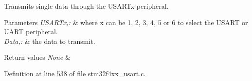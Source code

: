 Transmits single data through the U\-S\-A\-R\-Tx peripheral. 


\begin{DoxyParams}{Parameters}
{\em U\-S\-A\-R\-Tx,\-:} & where x can be 1, 2, 3, 4, 5 or 6 to select the U\-S\-A\-R\-T or U\-A\-R\-T peripheral. \\
\hline
{\em Data,\-:} & the data to transmit. \\
\hline
\end{DoxyParams}

\begin{DoxyRetVals}{Return values}
{\em None} & \\
\hline
\end{DoxyRetVals}


Definition at line 538 of file stm32f4xx\-\_\-usart.\-c.

